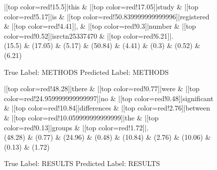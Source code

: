 \documentclass[a4paper, landscape]{article}
\begin{document}
\begin{figure}
\begin{center}
\begin{dependency}
\begin{deptext}
|[top color=red!15.5]|this \& |[top color=red!17.05]|study \& |[top color=red!5.17]|is \& |[top color=red!50.839999999999996]|registered \& |[top color=red!4.41]|, \& |[top color=red!0.3]|number \& |[top color=red!0.52]|isrctn25337470 \& |[top color=red!6.21]|.\\
(15.5) \& (17.05) \& (5.17) \& (50.84) \& (4.41) \& (0.3) \& (0.52) \& (6.21)\\
\end{deptext}
\end{dependency}
\end{center}
\caption{True Label: METHODS Predicted Label: METHODS}
\end{figure}
\clearpage
\begin{figure}
\begin{center}
\begin{dependency}
\begin{deptext}
|[top color=red!48.28]|there \& |[top color=red!0.77]|were \& |[top color=red!24.959999999999997]|no \& |[top color=red!0.48]|significant \& |[top color=red!10.84]|differences \& |[top color=red!2.76]|between \& |[top color=red!10.059999999999999]|the \& |[top color=red!0.13]|groups \& |[top color=red!1.72]|.\\
(48.28) \& (0.77) \& (24.96) \& (0.48) \& (10.84) \& (2.76) \& (10.06) \& (0.13) \& (1.72)\\
\end{deptext}
\end{dependency}
\end{center}
\caption{True Label: RESULTS Predicted Label: RESULTS}
\end{figure}
\clearpage
\end{document}
